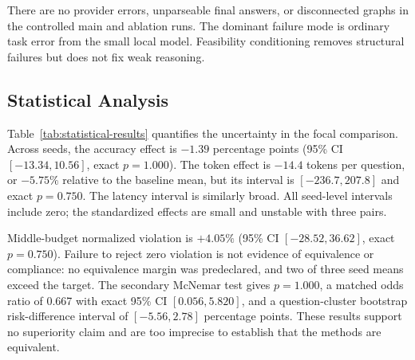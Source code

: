 There are no provider errors, unparseable final answers, or disconnected graphs in the controlled main and ablation runs. The dominant failure mode is ordinary task error from the small local model. Feasibility conditioning removes structural failures but does not fix weak reasoning.

\subsection{Statistical Analysis}



Table~\ref{tab:statistical-results} quantifies the uncertainty in the focal comparison. Across seeds, the accuracy effect is $-1.39$ percentage points (95\% CI $[-13.34, 10.56]$, exact $p=1.000$). The token effect is $-14.4$ tokens per question, or $-5.75\%$ relative to the baseline mean, but its interval is $[-236.7, 207.8]$ and exact $p=0.750$. The latency interval is similarly broad. All seed-level intervals include zero; the standardized effects are small and unstable with three pairs.

Middle-budget normalized violation is $+4.05\%$ (95\% CI $[-28.52, 36.62]$, exact $p=0.750$). Failure to reject zero violation is not evidence of equivalence or compliance: no equivalence margin was predeclared, and two of three seed means exceed the target. The secondary McNemar test gives $p=1.000$, a matched odds ratio of 0.667 with exact 95\% CI $[0.056, 5.820]$, and a question-cluster bootstrap risk-difference interval of $[-5.56, 2.78]$ percentage points. These results support no superiority claim and are too imprecise to establish that the methods are equivalent.
